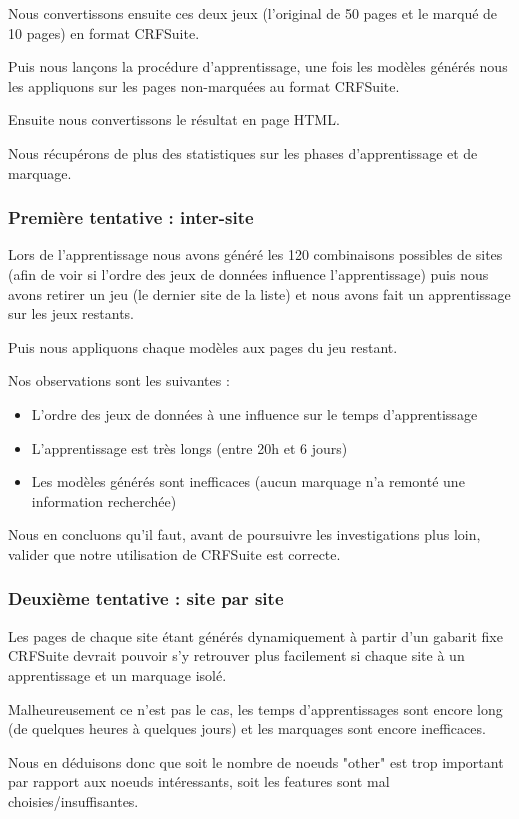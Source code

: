 \documentclass{article}
\begin{document}
Nous convertissons ensuite ces deux jeux (l'original de 50 pages et le marqué de 10
pages) en format CRFSuite.

Puis nous lançons la procédure d'apprentissage, une fois les modèles générés
nous les appliquons sur les pages non-marquées au format CRFSuite.

Ensuite nous convertissons le résultat en page HTML.

Nous récupérons de plus des statistiques sur les phases d'apprentissage et de
marquage.

\subsubsection{Première tentative : inter-site}
Lors de l'apprentissage nous avons généré les 120 combinaisons possibles de sites
(afin de voir si l'ordre des jeux de données influence l'apprentissage)
puis nous avons retirer un jeu (le dernier site de la liste) et nous avons fait
un apprentissage sur les jeux restants.

Puis nous appliquons chaque modèles aux pages du jeu restant.

Nos observations sont les suivantes :

\begin{itemize}
 \item L'ordre des jeux de données à une influence sur le temps d'apprentissage
 \item L'apprentissage est très longs (entre 20h et 6 jours)
 \item Les modèles générés sont inefficaces (aucun marquage n'a remonté une information recherchée)
\end{itemize}

Nous en concluons qu'il faut, avant de poursuivre les investigations plus loin,
valider que notre utilisation de CRFSuite est correcte.

\subsubsection{Deuxième tentative : site par site}
Les pages de chaque site étant générés dynamiquement à partir d'un gabarit fixe
CRFSuite devrait pouvoir s'y retrouver plus facilement si chaque site à un apprentissage
et un marquage isolé.

Malheureusement ce n'est pas le cas, les temps d'apprentissages sont encore long (de
quelques heures à quelques jours) et les marquages sont encore inefficaces.

Nous en déduisons donc que soit le nombre de noeuds "other" est trop important par
rapport aux noeuds intéressants, soit les features sont mal choisies/insuffisantes.
\end{document}
